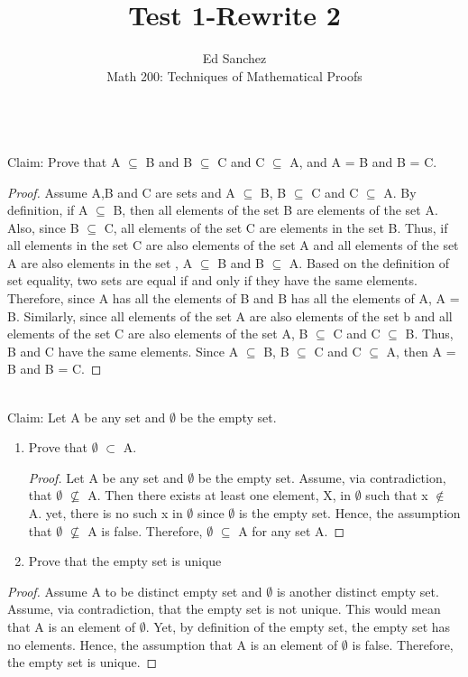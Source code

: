 \documentclass[12pt]{article}
\newenvironment{problem}[2][Problem]{\begin{trivlist}
\item[\hskip \labelsep {\bfseries #1}\hskip \labelsep {\bfseries #2.}]}{\end{trivlist}}
\begin{document}
 
\title{Test 1-Rewrite 2}
\author{Ed Sanchez\\ 
Math 200: Techniques of Mathematical Proofs}
 
\maketitle
 
\begin{problem}{1}
\text{ }\\
Claim: Prove that A $\subseteq$ B and B $\subseteq$ C and C $\subseteq$ A, and A = B and B = C. 
\end{problem}
 
\begin{proof}
Assume A,B and C are sets and A $\subseteq$ B, B $\subseteq$ C and C $\subseteq$ A. By definition, if A $\subseteq$ B, then all elements of the set B are elements of the set A. Also, since B $\subseteq$ C, all elements of the set C are elements in the set B. Thus, if all elements in the set C are also elements of the set A and all elements of the set A are also elements in the set , A $\subseteq$ B and B $\subseteq$ A. Based on the definition of set equality, two sets are equal if and only if they have the same elements. Therefore, since A has all the elements of B and B has all the elements of A, A = B. Similarly, since all elements of the set A are also elements of the set b and all elements of the set C are also elements of the set A, B $\subseteq$ C and C $\subseteq$ B. Thus, B and C have the same elements. Since A $\subseteq$ B, B $\subseteq$ C and C $\subseteq$ A, then A = B and B = C.   
\end{proof}
 
\begin{problem}{2}
\text{ }\\
 Claim: Let A be any set and $\emptyset$ be the empty set.   
\end{problem}
\begin{enumerate}
\item Prove that $\emptyset$ $\subset$ A.
\begin{proof}
Let A be any set and $\emptyset$ be the empty set. Assume, via contradiction, that $\emptyset$ $\not\subseteq$ A. Then there exists at least one element, X, in $\emptyset$ such that x $\not\in$ A. yet, there is no such x in $\emptyset$ since $\emptyset$ is the empty set. Hence, the assumption that $\emptyset$ $\not\subseteq$ A is false. Therefore, $\emptyset$ $\subseteq$ A for any set A. 
\end{proof}
\item Prove that the empty set is unique
\end{enumerate}
\begin{proof}
Assume A to be distinct empty set and $\emptyset$ is another distinct empty set. Assume, via contradiction, that the empty set is not unique. This would mean that A is an element of $\emptyset$. Yet, by definition of the empty set, the empty set has no elements. Hence, the assumption that A is an element of $\emptyset$ is false. Therefore, the empty set is unique.
\end{proof}
\end{document}
